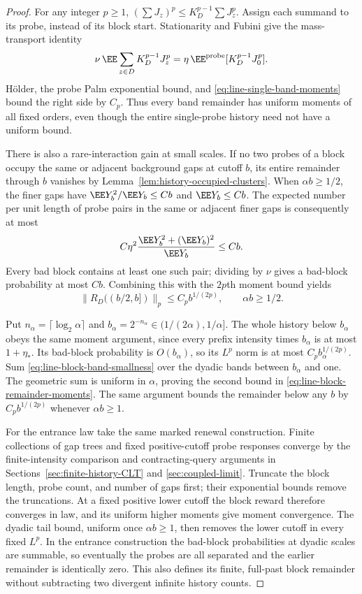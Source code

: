 \documentclass[11pt,letterpaper]{article}
\begin{document}
\begin{proof}
For any integer $p\ge1$,
$(\sum J_z)^p\le K_D^{p-1}\sum J_z^p$.
Assign each summand to its probe, instead of its block start.
Stationarity and Fubini give the mass-transport identity
\[
 \nu\,\EE\sum_{z\in D}K_D^{p-1}J_z^p
       =\eta\,\EE^{\rm probe}[K_D^{p-1}J_0^p].
\]
H\"older, the probe Palm exponential bound, and
\eqref{eq:line-single-band-moments} bound the right side by
$C_p$. Thus every band remainder has uniform moments of all
fixed orders, even though the entire single-probe history
need not have a uniform bound.

There is also a rare-interaction gain at small scales. If
no two probes of a block occupy the same or adjacent background
gaps at cutoff $b$, its entire remainder through $b$ vanishes
by Lemma~\ref{lem:history-occupied-clusters}. When
$\alpha b\ge1/2$, the finer gaps have
$\EE Y_b^2/\EE Y_b\le Cb$ and $\EE Y_b\le Cb$.
The expected number per unit length of probe pairs in the same
or adjacent finer gaps is consequently at most
\[
 C\eta^2\frac{\EE Y_b^2+(\EE Y_b)^2}{\EE Y_b}\le Cb.
\]
Every bad block contains at least one such pair; dividing by
$\nu$ gives a bad-block probability at most $Cb$.
Combining this with the $2p$th moment bound yields
\begin{equation}\label{eq:line-block-band-smallness}
 \|R_D((b/2,b])\|_p\le C_p b^{1/(2p)},
                    \qquad \alpha b\ge1/2.
\end{equation}

Put $n_\alpha=\lceil\log_2\alpha\rceil$ and
$b_\alpha=2^{-n_\alpha}\in(1/(2\alpha),1/\alpha]$.
The whole history below $b_\alpha$ obeys the same moment
argument, since every prefix intensity times $b_\alpha$
is at most $1+\eta_*$. Its bad-block probability is
$O(b_\alpha)$, so its $L^p$ norm is at most
$C_pb_\alpha^{1/(2p)}$. Sum
\eqref{eq:line-block-band-smallness} over the dyadic bands
between $b_\alpha$ and one. The geometric sum is uniform
in $\alpha$, proving the second bound in
\eqref{eq:line-block-remainder-moments}. The same argument
bounds the remainder below any $b$ by $C_pb^{1/(2p)}$
whenever $\alpha b\ge1$.

For the entrance law take the same marked renewal construction.
Finite collections of gap trees and fixed positive-cutoff
probe responses converge by the finite-intensity comparison
and contracting-query arguments in
Sections~\ref{sec:finite-history-CLT} and \ref{sec:coupled-limit}.
Truncate the block length, probe count, and number of gaps
first; their exponential bounds remove the truncations.
At a fixed positive lower cutoff the block reward therefore
converges in law, and its uniform higher moments give moment
convergence. The dyadic tail bound, uniform once $\alpha b\ge1$,
then removes the lower cutoff in every fixed $L^p$.
In the entrance construction the bad-block probabilities at
dyadic scales are summable, so eventually the probes are all
separated and the earlier remainder is identically zero.
This also defines its finite, full-past block remainder
without subtracting two divergent infinite history counts.
\end{proof}
\end{document}
